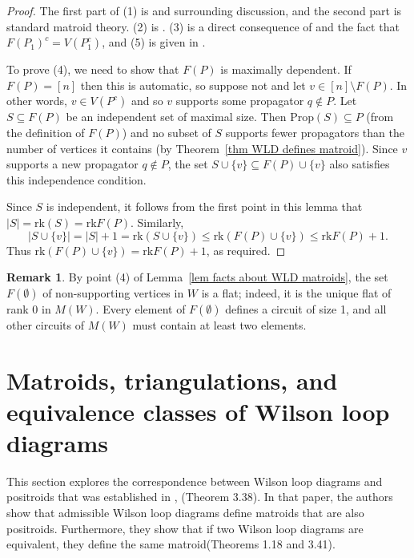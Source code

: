 \documentclass[11pt]{article}
\newcommand{\rk}{\textrm{rk} }
\newcommand{\Prop}{\textrm{Prop}}
\theoremstyle{remark}
\theoremstyle{definition}
\newtheorem{rmk}[thm]{Remark}
\begin{document}
\begin{proof}
The first part of (1) is \cite[Equation (9)]{wilsonloop} and surrounding discussion, and the second part is standard matroid theory. (2) is \cite[Lemma 3.27]{wilsonloop}. (3) is a direct consequence of \cite[Lemma 3.20]{wilsonloop} and the fact that $F(P_1)^c = V(P_1^c)$, and (5) is given in \cite[Lemma 3.28]{wilsonloop}.

To prove (4), we need to show that $F(P)$ is maximally dependent. If $F(P) = [n]$ then this is automatic, so suppose not and let $v \in [n] \setminus F(P)$. In other words, $v \in V(P^c)$ and so $v$ supports some propagator $q \not\in P$.  Let $S \subseteq F(P)$ be an independent set of maximal size. Then $\Prop(S) \subseteq P$ (from the definition of $F(P)$) and no subset of $S$ supports fewer propagators than the number of vertices it contains (by Theorem~\ref{thm WLD defines matroid}). Since $v$ supports a new propagator $q \not\in P$, the set $S \cup \{v\} \subseteq F(P) \cup \{v\}$ also satisfies this independence condition.

Since $S$ is independent, it follows from the first point in this lemma that $|S| = \rk(S) = \rk F(P)$. Similarly, 
\[|S \cup \{v\}| = |S|+1 = \rk (S \cup \{v\}) \leq \rk(F(P) \cup \{v\}) \leq \rk F(P) + 1.\]
Thus $\rk(F(P) \cup\{v\}) = \rk F(P) + 1$, as required.
\end{proof}

\begin{rmk}
By point (4) of Lemma~\ref{lem facts about WLD matroids}, the set $F(\emptyset)$ of non-supporting vertices in $W$ is a flat; indeed, it is the unique flat of rank 0 in $M(W)$. Every element of $F(\emptyset)$ defines a circuit of size 1, and all other circuits of $M(W)$ must contain at least two elements.
\end{rmk}




\section{Matroids, triangulations, and equivalence classes of Wilson loop diagrams}\label{sec equiv}

This section explores the correspondence between Wilson loop diagrams and positroids that was established in \cite{wilsonloop}, (Theorem 3.38). In that paper, the authors show that admissible Wilson loop diagrams define matroids that are also positroids. Furthermore, they show that if two Wilson loop diagrams are equivalent, they define the same matroid(Theorems 1.18 and 3.41).
\end{document}
